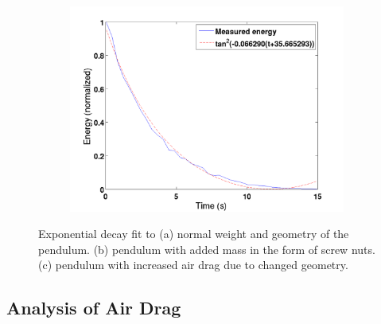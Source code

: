 \begin{figure}[htbp]
\begin{subfigure}{.45\textwidth}
	\caption{}
	\label{fig:resultTanHeavy}
\end{subfigure}\\
\begin{subfigure}{.45\textwidth}
	\centering
	\includegraphics[width=\textwidth]{img/resultTanDraggy}
	\caption{}
	\label{fig:resultTanDraggy}
\end{subfigure}
\caption{Exponential decay fit to (a) normal weight and geometry of the  pendulum. (b) pendulum with added mass in the form of screw nuts. (c) pendulum with increased air drag due to changed geometry.}
\label{fig:resultTan}
\end{figure}


\subsection{Analysis of Air Drag}\label{sec:airdrag}

